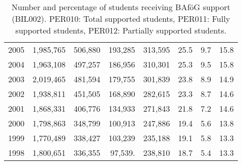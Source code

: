 \begin{table}[H]
\begin{tabular}{rrrrrrrr}
2005 & 1,985,765 & 506,880 & 193,285 & 313,595 & 25.5 & 9.7 & 15.8 \\
2004 & 1,963,108 & 497,257 & 186,956 & 310,301 & 25.3 & 9.5 & 15.8 \\
2003 & 2,019,465 & 481,594 & 179,755 & 301,839 & 23.8 & 8.9 & 14.9 \\
2002 & 1,938,811 & 451,505 & 168,890 & 282,615 & 23.3 & 8.7 & 14.6 \\
2001 & 1,868,331 & 406,776 & 134,933 & 271,843 & 21.8 & 7.2 & 14.6 \\
2000 & 1,798,863 & 348,799 & 100,913 & 247,886 & 19.4 & 5.6 & 13.8 \\
1999 & 1,770,489 & 338,427 & 103,239 & 235,188 & 19.1 & 5.8 & 13.3 \\
1998 & 1,800,651 & 336,355 & 97,539.& 238,810 & 18.7 & 5.4 & 13.3 \\
\bottomrule
\end{tabular}
\caption{
  Number and percentage of students receiving BAföG support (BIL002).  
  PER010: Total supported students, PER011: Fully supported students, PER012: Partially supported students.
}
\label{table:bafoeg_support}
\end{table}





